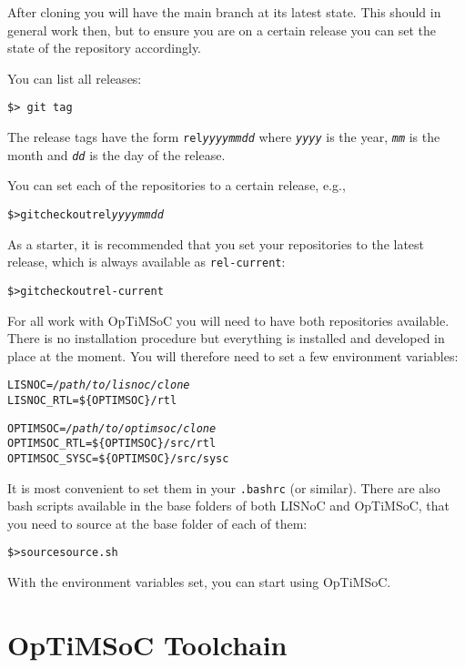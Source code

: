 After cloning you will have the main branch at its latest state. This
should in general work then, but to ensure you are on a certain
release you can set the state of the repository accordingly.

You can list all releases:

\begin{verbatim}
$> git tag
\end{verbatim}

The release tags have the form \texttt{rel\emph{yyyymmdd}} where
\texttt{\emph{yyyy}} is the year, \texttt{\emph{mm}} is the month and
\texttt{\emph{dd}} is the day of the release.

You can set each of the repositories to a certain release, e.g.,

\begin{alltt}
\$> git checkout rel\emph{yyyymmdd}
\end{alltt}

As a starter, it is recommended that you set your repositories to the
latest release, which is always available as \texttt{rel-current}:

\begin{alltt}
\$> git checkout rel-current
\end{alltt}

For all work with OpTiMSoC you will need to have both repositories
available. There is no installation procedure but everything is
installed and developed in place at the moment. You will therefore
need to set a few environment variables:

\begin{alltt}
LISNOC = \emph{/path/to/lisnoc/clone}
LISNOC_RTL = \$\{OPTIMSOC\}/rtl

OPTIMSOC = \emph{/path/to/optimsoc/clone}
OPTIMSOC_RTL = \$\{OPTIMSOC\}/src/rtl
OPTIMSOC_SYSC = \$\{OPTIMSOC\}/src/sysc
\end{alltt}

It is most convenient to set them in your \verb|.bashrc| (or similar).
There are also bash scripts available in the base folders of both
LISNoC and OpTiMSoC, that you need to source at the base folder of
each of them:

\begin{alltt}
\$> source source.sh
\end{alltt}

With the environment variables set, you can start using OpTiMSoC.

\section{OpTiMSoC Toolchain}

